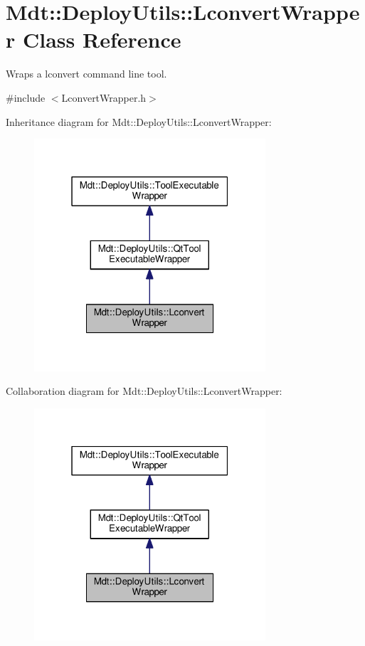 \hypertarget{class_mdt_1_1_deploy_utils_1_1_lconvert_wrapper}{}\section{Mdt\+:\+:Deploy\+Utils\+:\+:Lconvert\+Wrapper Class Reference}
\label{class_mdt_1_1_deploy_utils_1_1_lconvert_wrapper}


Wraps a lconvert command line tool.  




{\ttfamily \#include $<$Lconvert\+Wrapper.\+h$>$}



Inheritance diagram for Mdt\+:\+:Deploy\+Utils\+:\+:Lconvert\+Wrapper\+:\nopagebreak
\begin{figure}[H]
\begin{center}
\leavevmode
\includegraphics[width=244pt]{class_mdt_1_1_deploy_utils_1_1_lconvert_wrapper__inherit__graph}
\end{center}
\end{figure}


Collaboration diagram for Mdt\+:\+:Deploy\+Utils\+:\+:Lconvert\+Wrapper\+:\nopagebreak
\begin{figure}[H]
\begin{center}
\leavevmode
\includegraphics[width=244pt]{class_mdt_1_1_deploy_utils_1_1_lconvert_wrapper__coll__graph}
\end{center}
\end{figure}
